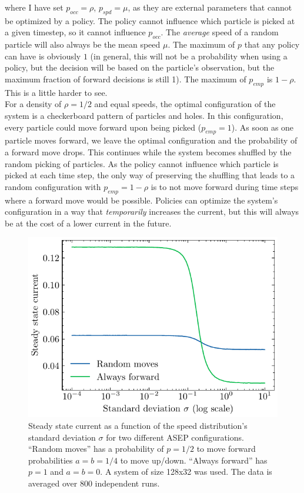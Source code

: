 where I have set $p_{occ}=\rho$, $p_{spd}=\mu$, as they are external parameters that cannot be optimized by a policy. The policy cannot influence which particle is picked at a given timestep, so it cannot influence $p_{occ}$. The \textit{average} speed of a random particle will also always be the mean speed $\mu$. The maximum of $p$ that any policy can have is obviously $1$ (in general, this will not be a probability when using a policy, but the decision will be based on the particle's observation, but the maximum fraction of forward decisions is still 1). The maximum of $p_{emp}$ is $1-\rho$. This is a little harder to see. 
\\
For a density of $\rho=1/2$ and equal speeds, the optimal configuration of the system is a checkerboard pattern of particles and holes. In this configuration, every particle could move forward upon being picked ($p_{emp}=1$). As soon as one particle moves forward, we leave the optimal configuration and the probability of a forward move drops. This continues while the system becomes shuffled by the random picking of particles. As the policy cannot influence which particle is picked at each time step, the only way of preserving the shuffling that leads to a random configuration with $p_{emp}=1-\rho$ is to not move forward during time steps where a forward move would be possible. Policies can optimize the system's configuration in a way that \textit{temporarily} increases the current, but this will always be at the cost of a lower current in the future. %

\begin{figure}[h]
    \centering
    \includegraphics{steady_state_current_both_log.pdf}
    \caption{Steady state current as a function of the speed distribution's standard deviation $\sigma$ for two different ASEP configurations. \enquote{Random moves} has a probability of $p=1/2$ to move forward probabilities $a=b=1/4$ to move up/down. \enquote{Always forward} has $p=1$ and $a=b=0$. A system of size 128x32 was used. The data is averaged over 800 independent runs.}
    \label{fig:steady_state_current_always_forward}
\end{figure}
